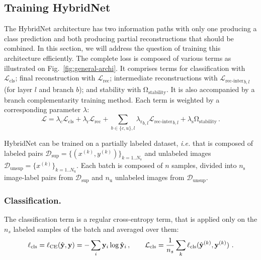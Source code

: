 \documentclass[runningheads]{llncs}
\begin{document}
\subsection{Training HybridNet}
\label{sec:training}

The HybridNet architecture has two information paths with only one producing a class prediction and both producing partial reconstructions that should be combined. In this section, we will address the question of training this architecture efficiently. The complete loss is composed of various terms as illustrated on Fig.~\ref{fig:general-archi}. It comprises terms for classification with $\mathcal L_\textrm{cls}$; final reconstruction with ${\mathcal L_\textrm{rec}}$; intermediate reconstructions with ${\mathcal L_\textrm{rec-inter}}_{b,l}$ (for layer $l$ and branch $b$); and stability with $\mathrm{\Omega}_\textrm{stability}$. It is also accompanied by a branch complementarity training method. Each term is weighted by a corresponding parameter $\lambda$:
\begin{equation}\textstyle
	\mathcal L = \lambda_\textrm{c} \mathcal L_\textrm{cls} + \lambda_\textrm{r} \mathcal L_\textrm{rec} + \sum_{b\in \{c,u\},l} {\lambda_\textrm{r}}_{b,l} {\mathcal L_\textrm{rec-inter}}_{b,l} + \lambda_\textrm{s} \mathrm{\Omega}_\textrm{stability} \,.
    \label{eq:full-loss}
\end{equation}

HybridNet can be trained on a partially labeled dataset, \textit{i.e.} that is composed of labeled pairs $\mathcal D_\textrm{sup} = \{(x^{(k)}, y^{(k)})\}_{k=1..N_\textrm{s}}$ and unlabeled images $\mathcal D_\textrm{unsup} = \{x^{(k)}\}_{k=1..N_\textrm{u}}$.
Each batch is composed of $n$ samples, divided into $n_\textrm{s}$ image-label pairs from $\mathcal D_\textrm{sup}$ and $n_\textrm{u}$ unlabeled images from $\mathcal D_\textrm{unsup}$.

\subsubsection{Classification.}

The classification term is a regular cross-entropy term, that is applied only on the $n_s$ labeled samples of the batch and averaged over them:
\begin{equation}
	\ell_\mathrm{cls} = \ell_\mathrm{CE}(\vyh, \vy) = -\sum_i \vy_i \log \vyh_i \, , \qquad \mathcal L_\textrm{cls}=\frac{1}{n_s} \sum_k \ell_\mathrm{cls}(\vyh\kk, \vy\kk) \ .
\end{equation}
\end{document}
